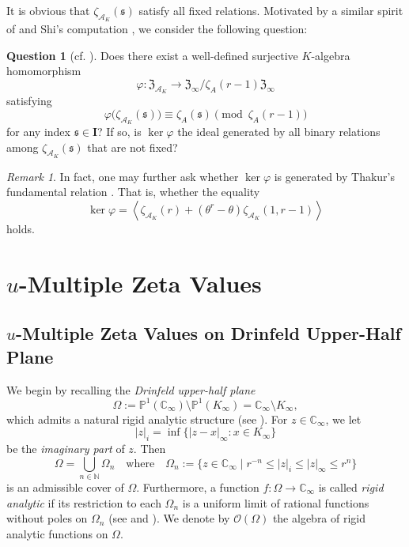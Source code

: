 \documentclass[12pt,reqno]{amsart}
\numberwithin{equation}{section}
\theoremstyle{plain}
\theoremstyle{definition}
\newtheorem{question}[thm]{Question}
\theoremstyle{remark}
\newtheorem{rmk}[thm]{Remark}
\newcommand{\NN}{\mathbb{N}}
\newcommand{\CC}{\mathbb{C}}
\newcommand{\PP}{\mathbb{P}}
\newcommand{\Acal}{\mathcal{A}}
\newcommand{\Ocal}{\mathcal{O}}
\renewcommand{\ker}{\operatorname{ker}}
\newcommand{\ww}[1]{\mathfrak{#1}}
\newcommand{\Ical}{\mathbf{I}}
\newcommand{\Zcal}{\mathfrak{Z}}
\begin{document}
It is obvious that $\zeta_{\Acal_K}(\ww{s})$ satisfy all fixed relations. Motivated by a similar spirit of  \cite{BTT18} and Shi's computation \cite{Shi2018}, we consider the following question:

\begin{question}[cf. {\cite[Conjecture 4.6.5]{Shi2018}}]\label{conj:Function_field_KZ}
    Does there exist a well-defined surjective $K$-algebra homomorphism
    \[
    \varphi : \Zcal_{\mathcal{A}_K} \longrightarrow \Zcal_\infty / \zeta_A(r-1)\Zcal_\infty  
    \]
    satisfying
    \[
    \varphi\bigl(\zeta_{\mathcal{A}_K}(\ww{s})\bigr) \equiv \zeta_A(\ww{s}) \pmod{\zeta_A(r-1)}
    \]
    for any index $\ww{s} \in \Ical$? If so, is  $\ker\varphi$ the ideal generated by all binary relations among $\zeta_{\Acal_K}(\ww{s})$ that are not fixed?
\end{question}

\begin{rmk}
In fact, one may further ask whether $\ker\varphi$ is generated by Thakur's fundamental relation  \cite[Theorem 5]{Thakur2009}. That is, whether the equality
  \[
    \ker\varphi = \left\langle \zeta_{\mathcal{A}_K}(r) + (\theta^r - \theta)\zeta_{\mathcal{A}_K}(1, r-1) \right\rangle
    \]
holds.
\end{rmk}

\section{\texorpdfstring{$u$}{u}-Multiple Zeta Values}\label{section:4}
\subsection{\texorpdfstring{$u$}{u}-Multiple Zeta Values on Drinfeld Upper-Half Plane}\label{section:4.1}
We begin by recalling the \textit{Drinfeld upper-half plane}
$$\Omega := \PP^1(\CC_\infty) \setminus \PP^1(K_\infty) = \CC_\infty \setminus K_\infty,$$
which admits a natural rigid analytic structure (see \cite[Proposition 6.1]{Drinfeld1974}). For $z\in\CC_\infty$, we let  $$|z|_i=\inf\{|z-x|_\infty:x\in K_\infty\}$$
be the \textit{imaginary part} of $z$. Then 
\[
\Omega = \bigcup_{n \in \NN} \Omega_n
\quad
\text{where}
\quad
\Omega_n := \{z \in \CC_\infty \mid  r^{-n} \leq |z|_i \leq |z|_\infty \leq r^n\}
\]
is an admissible cover of $\Omega$. Furthermore, a function $f:\Omega\to\CC_\infty$ is called \textit{rigid analytic} if its restriction to each $\Omega_n$ is a uniform limit of rational functions without poles on $\Omega_n$ (see \cite{Goss1980a} and \cite{FresnelPut2004}). We denote by $\Ocal(\Omega)$ the algebra of rigid analytic functions on $\Omega$.
\end{document}
